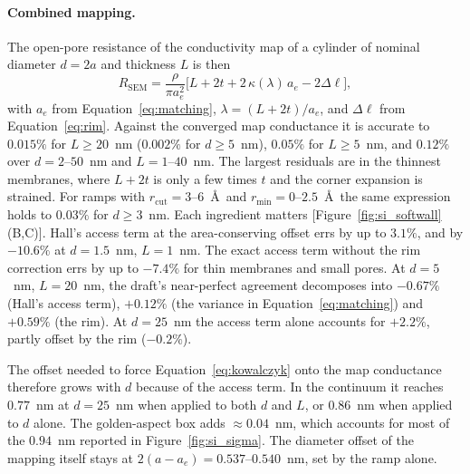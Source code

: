 \paragraph{Combined mapping.}
The open-pore resistance of the conductivity map of a cylinder of nominal diameter $d = 2a$ and thickness $L$ is then
\begin{equation}
R_\mathrm{SEM} = \frac{\rho}{\pi a_e^{2}}\bigl[L + 2t + 2\,\kappa(\lambda)\,a_e - 2\Delta\ell\bigr],
\label{eq:semfull}
\end{equation}
with $a_e$ from Equation~\eqref{eq:matching}, $\lambda = (L + 2t)/a_e$, and $\Delta\ell$ from Equation~\eqref{eq:rim}. Against the converged map conductance it is accurate to $0.015\%$ for $L \ge 20$~nm ($0.002\%$ for $d \ge 5$~nm), $0.05\%$ for $L \ge 5$~nm, and $0.12\%$ over $d = 2$--$50$~nm and $L = 1$--$40$~nm. The largest residuals are in the thinnest membranes, where $L + 2t$ is only a few times $t$ and the corner expansion is strained. For ramps with $r_\mathrm{cut} = 3$--$6$~\AA\ and $r_\mathrm{min} = 0$--$2.5$~\AA\ the same expression holds to $0.03\%$ for $d \ge 3$~nm. Each ingredient matters [Figure~\ref{fig:si_softwall}(B,C)]. Hall's access term at the area-conserving offset errs by up to $3.1\%$, and by $-10.6\%$ at $d = 1.5$~nm, $L = 1$~nm. The exact access term without the rim correction errs by up to $-7.4\%$ for thin membranes and small pores. At $d = 5$~nm, $L = 20$~nm, the draft's near-perfect agreement decomposes into $-0.67\%$ (Hall's access term), $+0.12\%$ (the variance in Equation~\eqref{eq:matching}) and $+0.59\%$ (the rim). At $d = 25$~nm the access term alone accounts for $+2.2\%$, partly offset by the rim ($-0.2\%$).

The offset needed to force Equation~\eqref{eq:kowalczyk} onto the map conductance therefore grows with $d$ because of the access term. In the continuum it reaches $0.77$~nm at $d = 25$~nm when applied to both $d$ and $L$, or $0.86$~nm when applied to $d$ alone. The golden-aspect box adds $\approx 0.04$~nm, which accounts for most of the $0.94$~nm reported in Figure~\ref{fig:si_sigma}. The diameter offset of the mapping itself stays at $2(a - a_e) = 0.537$--$0.540$~nm, set by the ramp alone.


